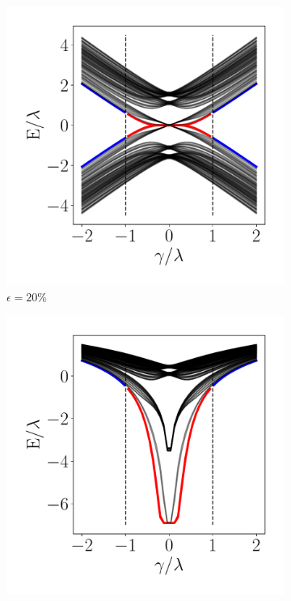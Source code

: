 \begin{figure}[tbh!]
     \begin{minipage}[h!]{0.9\textwidth}
         \begin{subfigure}[b!]{0.3 \textwidth}
            \caption{$\epsilon = 20\%$}             \includegraphics[width=\textwidth]{Imagenes/Resultados_Hoti_Fractal/bands_square_shh_0.2.pdf}
         \end{subfigure}\hspace*{-0.5em}
         \begin{subfigure}[b!]{0.3 \textwidth}
            \caption*{}
            \includegraphics[width=\textwidth]{Imagenes/Resultados_Hoti_Fractal/bands_square_shh_log0.2.pdf}

\end{subfigure}
\end{minipage}
\end{figure}
